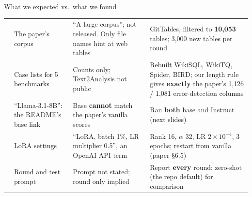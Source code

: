 \documentclass[11pt,aspectratio=169]{beamer}
\begin{document}
\begin{frame}{What we expected vs.\ what we found}
\vspace{0.05cm}
{\footnotesize\setlength{\tabcolsep}{4pt}\renewcommand{\arraystretch}{1.1}
\begin{tabular}{@{}L{1.85cm}L{3.0cm}L{3.75cm}>{}L{4.9cm}@{}}
\toprule
&  &  & \\\midrule
{} & The paper's corpus & ``A large corpus''; not released. Only file names hint at web tables & GitTables, filtered to \textbf{10,053} tables; 3,000 new tables per round\\
 & Case lists for 5 benchmarks & Counts only; Text2Analysis not public & Rebuilt WikiSQL, WikiTQ, Spider, BIRD; our length rule gives \textbf{exactly} the paper's 1,126 / 1,081 error-detection columns\\
 & ``Llama-3.1-8B'': the README's base link & Base \textbf{cannot} match the paper's vanilla scores & Ran \textbf{both} base and Instruct (next slides)\\
 & LoRA settings & ``LoRA, batch 1\%, LR multiplier 0.5'', an OpenAI API term & Rank 16, $\alpha$ 32, LR $2\!\times\!10^{-4}$, 3 epochs; restart from vanilla (paper \S6.5)\\
 & Round and test prompt & Prompt not stated; round only implied & Report \textbf{every} round; zero-shot (the repo default) for comparison\\
\bottomrule
\end{tabular}}
\vspace{0.12cm}

\end{frame}
\end{document}
